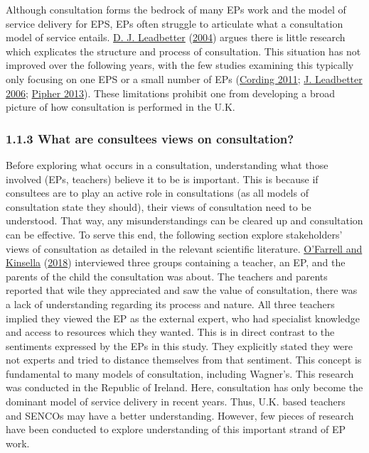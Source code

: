\documentclass[
]{article}
\begin{document}
Although consultation forms the bedrock of many EPs work and the model
of service delivery for EPS, EPs often struggle to articulate what a
consultation model of service entails.
\protect\hyperlink{ref-leadbetterRoleMediatingArtefacts2004}{D. J.
Leadbetter}
(\protect\hyperlink{ref-leadbetterRoleMediatingArtefacts2004}{2004})
argues there is little research which explicates the structure and
process of consultation. This situation has not improved over the
following years, with the few studies examining this typically only
focusing on one EPS or a small number of EPs
(\protect\hyperlink{ref-cordingStudyEducationalPsychologists2011}{Cording
2011};
\protect\hyperlink{ref-leadbetterInvestigatingConceptualisingNotion2006}{J.
Leadbetter 2006};
\protect\hyperlink{ref-pipherConsultationApproachTeacher2013a}{Pipher
2013}). These limitations prohibit one from developing a broad picture
of how consultation is performed in the U.K.

\hypertarget{what-are-consultees-views-on-consultation}{%
\subsubsection{1.1.3 What are consultees views on
consultation?}\label{what-are-consultees-views-on-consultation}}

Before exploring what occurs in a consultation, understanding what those
involved (EPs, teachers) believe it to be is important. This is because
if consultees are to play an active role in consultations (as all models
of consultation state they should), their views of consultation need to
be understood. That way, any misunderstandings can be cleared up and
consultation can be effective. To serve this end, the following section
explore stakeholders' views of consultation as detailed in the relevant
scientific literature.
\protect\hyperlink{ref-ofarrellResearchExploringParents2018}{O'Farrell
and Kinsella}
(\protect\hyperlink{ref-ofarrellResearchExploringParents2018}{2018})
interviewed three groups containing a teacher, an EP, and the parents of
the child the consultation was about. The teachers and parents reported
that wile they appreciated and saw the value of consultation, there was
a lack of understanding regarding its process and nature. All three
teachers implied they viewed the EP as the external expert, who had
specialist knowledge and access to resources which they wanted. This is
in direct contrast to the sentiments expressed by the EPs in this study.
They explicitly stated they were not experts and tried to distance
themselves from that sentiment. This concept is fundamental to many
models of consultation, including Wagner's. This research was conducted
in the Republic of Ireland. Here, consultation has only become the
dominant model of service delivery in recent years. Thus, U.K. based
teachers and SENCOs may have a better understanding. However, few pieces
of research have been conducted to explore understanding of this
important strand of EP work.
\end{document}
